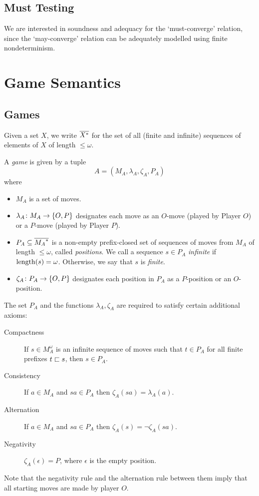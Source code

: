 \documentclass{entcs} \usepackage{prentcsmacro}
\newcommand{\0}{{\mathtt{0}}}
\begin{document}
\subsection{Must Testing}

We are interested in soundness and adequacy for the `must-converge' relation, since the `may-converge' relation can be adequately modelled using finite nondeterminism.  

\section{Game Semantics}

\subsection{Games}

\begin{definition}

  Given a set $X$, we write ${\overline{{X}^{*}}}$ for the set of all (finite and infinite) sequences of elements of $X$ of length $\le \omega$.  

  A \emph{game} is given by a tuple
  \[
    A = (M_A, \lambda_A, \zeta_A, P_A)
    \]
  where
  \begin{itemize}
    \item $M_A$ is a set of moves.
    \item $\lambda_A\colon M_A\to\{O,P\}$ designates each move as an $O$-move (played by Player $O$) or a $P$-move (played by Player $P$).  
    \item $P_A\subseteq {\overline{{M_A}^{*}}}$ is a non-empty prefix-closed set of sequences of moves from $M_A$ of length $\le\omega$, called \emph{positions}.  We call a sequence $s\in P_A$ \emph{infinite} if $\operatorname{length}(s)=\omega$.  Otherwise, we say that $s$ is \emph{finite}.
    \item $\zeta_A\colon P_A\to\{O,P\}$ designates each position in $P_A$ as a $P$-position or an $O$-position.
  \end{itemize}

  The set $P_A$ and the functions $\lambda_A,\zeta_A$ are required to satisfy certain additional axioms:
  \begin{description}
    \item[Compactness] If $s\in M_A^\omega$ is an infinite sequence of moves such that $t\in P_A$ for all finite prefixes $t\sqsubset s$, then $s\in P_A$.
    \item[Consistency] If $a\in M_A$ and $sa\in P_A$ then $\zeta_A(sa)=\lambda_A(a)$.
    \item[Alternation] If $a\in M_A$ and $sa\in P_A$ then $\zeta_A(s) = \neg \zeta_A(sa)$.
    \item[Negativity] $\zeta_A(\epsilon)=P$, where $\epsilon$ is the empty position.
  \end{description}

  Note that the negativity rule and the alternation rule between them imply that all starting moves are made by player $O$.  
\end{definition}
\end{document}
